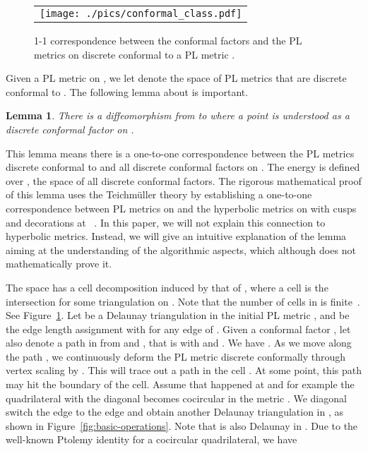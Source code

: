 \documentclass[11pt]{article}
\newtheorem{lemma}[theorem]{Lemma}
\begin{document}
\begin{figure}[t]
\begin{center}
\begin{tabular}{c}
\texttt{[image: ./pics/conformal\_class.pdf]}
\end{tabular}
\end{center}
\vspace{-0.1in}
\caption{1-1 correspondence between the conformal factors and the PL metrics on  discrete 
conformal to a PL metric . 
\label{fig:conformal_class}}
\end{figure}


Given a PL metric  on , we let  denote the space of PL metrics that
are discrete conformal to . The following lemma about  is important. 
\begin{lemma}
\label{lem:conformalmetricspace}
There is a  diffeomorphism from  to  where a point  is 
understood as a discrete conformal factor on . 
\end{lemma}
This lemma means there is a one-to-one correspondence between the PL metrics
discrete conformal to  and all discrete conformal factors on .
The energy is defined over , the space of all discrete conformal factors.  
The rigorous mathematical proof of this lemma uses the Teichm\"uller theory by 
establishing a one-to-one correspondence between PL metrics on  and the 
hyperbolic metrics on  with cusps and 
decorations at ~\cite{glsw1}. In this paper, we will not explain this 
connection to hyperbolic metrics. Instead, we will give an intuitive explanation of
the lemma aiming at the understanding of the algorithmic aspects, which although does not 
mathematically prove it. 

The space  has a cell 
decomposition induced by that of , where a cell is the intersection 
 for some triangulation  on . 
Note that the number of cells in  is finite~\cite{glsw1}. See Figure~\ref{fig:conformal_class}.
Let  be a Delaunay triangulation in the initial PL metric , and  be the
edge length assignment with  for any edge  of . Given a conformal factor 
, let  also denote a path in  from  and , 
that is  with  and .
We have . As we move along the path , we continuously 
deform the PL metric  discrete conformally through vertex scaling  by .
This will trace out a path  in the cell . 
At some point, this path may hit the boundary of 
the cell. Assume that happened at  and for example the quadrilateral  with the diagonal 
becomes cocircular in the metric .
We diagonal switch the edge  to the edge  and obtain another Delaunay 
triangulation  in , as shown in Figure~\ref{fig:basic-operations}.
Note that  is also Delaunay in . Due to the well-known Ptolemy identity 
for a  cocircular quadrilateral, we have 
\end{document}
